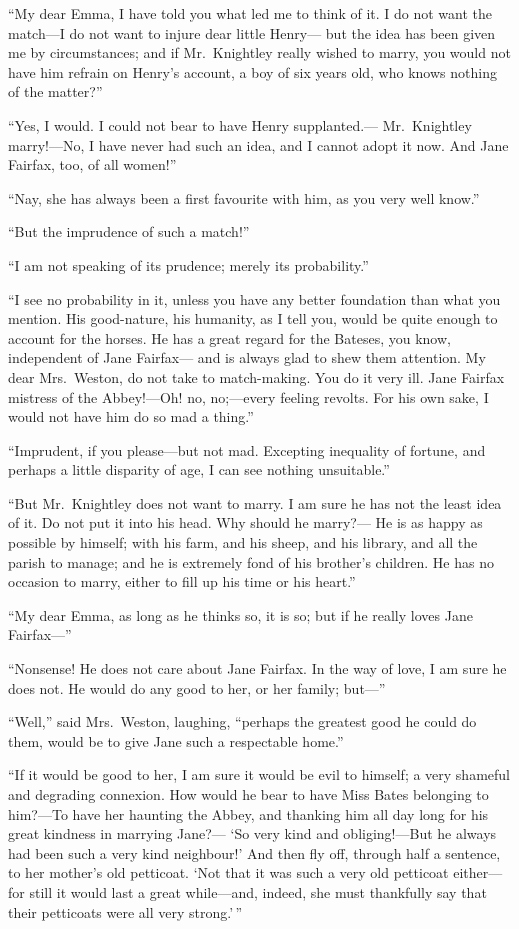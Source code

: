 ``My dear Emma, I have told you what led me to think of it.
I do not want the match---I do not want to injure dear little Henry---%
but the idea has been given me by circumstances; and if Mr.\ Knightley
really wished to marry, you would not have him refrain on Henry's
account, a boy of six years old, who knows nothing of the matter?''

``Yes, I would.  I could not bear to have Henry supplanted.---%
Mr.\ Knightley marry!---No, I have never had such an idea, and I
cannot adopt it now.  And Jane Fairfax, too, of all women!''

``Nay, she has always been a first favourite with him, as you
very well know.''

``But the imprudence of such a match!''

``I am not speaking of its prudence; merely its probability.''

``I see no probability in it, unless you have any better foundation
than what you mention.  His good-nature, his humanity, as I tell you,
would be quite enough to account for the horses.  He has a great
regard for the Bateses, you know, independent of Jane Fairfax---%
and is always glad to shew them attention.  My dear Mrs.\ Weston,
do not take to match-making.  You do it very ill.  Jane Fairfax mistress
of the Abbey!---Oh! no, no;---every feeling revolts.  For his own sake,
I would not have him do so mad a thing.''

``Imprudent, if you please---but not mad.  Excepting inequality of fortune,
and perhaps a little disparity of age, I can see nothing unsuitable.''

``But Mr.\ Knightley does not want to marry.  I am sure he has not the
least idea of it.  Do not put it into his head.  Why should he marry?---%
He is as happy as possible by himself; with his farm, and his sheep,
and his library, and all the parish to manage; and he is extremely
fond of his brother's children.  He has no occasion to marry,
either to fill up his time or his heart.''

``My dear Emma, as long as he thinks so, it is so; but if he really
loves Jane Fairfax---''

``Nonsense!  He does not care about Jane Fairfax.  In the way
of love, I am sure he does not.  He would do any good to her,
or her family; but---''

``Well,'' said Mrs.\ Weston, laughing, ``perhaps the greatest good he
could do them, would be to give Jane such a respectable home.''

``If it would be good to her, I am sure it would be evil to himself;
a very shameful and degrading connexion.  How would he bear to have
Miss Bates belonging to him?---To have her haunting the Abbey,
and thanking him all day long for his great kindness in marrying Jane?---%
`So very kind and obliging!---But he always had been such a very
kind neighbour!'  And then fly off, through half a sentence,
to her mother's old petticoat.  `Not that it was such a very old
petticoat either---for still it would last a great while---and, indeed,
she must thankfully say that their petticoats were all very strong.'\,''

